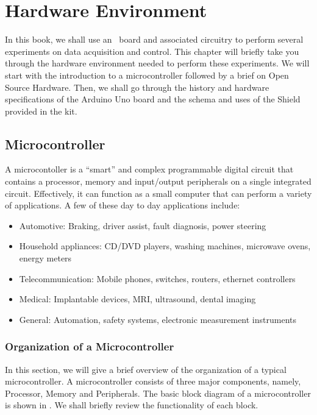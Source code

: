 \chapter{Hardware Environment}
\thispagestyle{empty}
\label{sec:hw-env}
\newcommand{\LocHWfig}{\Origin/user-code/hw-env/figures}
\newcommand{\LocHWscicode}{\Origin/user-code/hw-env/scilab}
\newcommand{\LocHWscibrief}{Origin/user-code/hw-env/scilab}
\newcommand{\LocHWardcode}{\Origin/user-code/hw-env/arduino}
\newcommand{\LocHWardbrief}{\tt Origin/user-code/hw-env/arduino}
\newcommand{\LocSH}{\Origin/tools/shield}
\newcommand{\LocSHbrief}[1]{{\tt Origin/tools/shield/#1}, see \fnrefp{fn:file-loc}}

In this book, we shall use an \arduino\ board and associated circuitry
to perform several experiments on data acquisition and control. This
chapter will briefly take you through the hardware environment needed
to perform these experiments. We will start with the introduction to a
microcontroller followed by a brief on Open Source Hardware. Then, we
shall go through the history and hardware specifications of the
Arduino Uno board and the schema and uses of the Shield provided in
the kit.


\section{Microcontroller}
A microcontoller is a ``smart'' and complex programmable digital circuit
that contains a processor, memory and input/output peripherals on a
single integrated circuit. Effectively, it can function as a small
computer that can perform a variety of applications. A few of these
day to day applications include:
\begin{itemize}
\item Automotive: Braking, driver assist, fault diagnosis, power
  steering
\item Household appliances: CD/DVD players, washing machines,
  microwave ovens, energy meters
\item Telecommunication: Mobile phones, switches, routers, ethernet
  controllers
\item Medical: Implantable devices, MRI, ultrasound, dental imaging
\item General: Automation, safety systems, electronic measurement
  instruments
\end{itemize}

\subsection{Organization of a Microcontroller}
In this section, we will give a brief overview of the organization of
a typical microcontroller.  A microcontroller consists of three major
components, namely, Processor, Memory and Peripherals. The basic block
diagram of a microcontroller is shown in . We shall
briefly review the functionality of each block.

